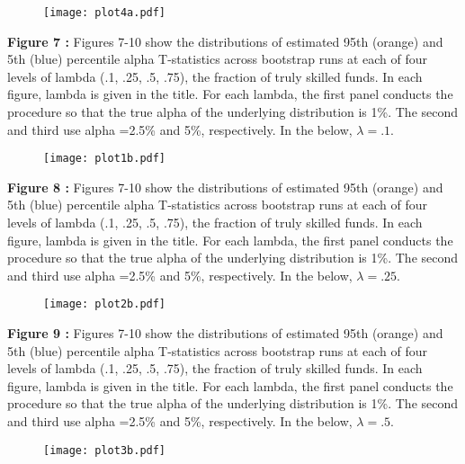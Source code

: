 \documentclass{article}
\begin{document}
\begin{center}
 \begin{figure}[h!]
 \texttt{[image: plot4a.pdf]}\label{fig:plot4a}
 \end{figure}
 \end{center}
\clearpage 
\textbf{Figure 7 : }Figures 7-10 show the distributions of estimated 95th (orange) and 5th (blue) percentile alpha T-statistics across bootstrap runs at each of four levels of lambda (.1, .25, .5, .75), the fraction of truly skilled funds.  In each figure, lambda is given in the title.  For each lambda, the first panel conducts the procedure so that the true alpha of the underlying distribution is 1\%.  The second and third use alpha =2.5\% and 5\%, respectively.  In the below, $\lambda=.1$.
\begin{center}
 \begin{figure}[h!]
 \texttt{[image: plot1b.pdf]}\label{fig:plot1b}
 \end{figure}
 \end{center}
\clearpage 
\textbf{Figure 8 : }Figures 7-10 show the distributions of estimated 95th (orange) and 5th (blue) percentile alpha T-statistics across bootstrap runs at each of four levels of lambda (.1, .25, .5, .75), the fraction of truly skilled funds.  In each figure, lambda is given in the title.  For each lambda, the first panel conducts the procedure so that the true alpha of the underlying distribution is 1\%.  The second and third use alpha =2.5\% and 5\%, respectively.  In the below, $\lambda=.25$.
\begin{center}
 \begin{figure}[h!]
 \texttt{[image: plot2b.pdf]}\label{fig:plot2b}
 \end{figure}
 \end{center}
\clearpage 
\textbf{Figure 9 : }Figures 7-10 show the distributions of estimated 95th (orange) and 5th (blue) percentile alpha T-statistics across bootstrap runs at each of four levels of lambda (.1, .25, .5, .75), the fraction of truly skilled funds.  In each figure, lambda is given in the title.  For each lambda, the first panel conducts the procedure so that the true alpha of the underlying distribution is 1\%.  The second and third use alpha =2.5\% and 5\%, respectively.  In the below, $\lambda=.5$.
\begin{center}
 \begin{figure}[h!]
 \texttt{[image: plot3b.pdf]}\label{fig:plot3b}
 \end{figure}
 \end{center}
\end{document}
